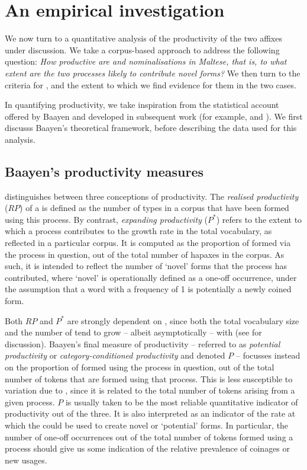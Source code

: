 \documentclass[output=paper]{LSP/langsci}
\begin{document}
\section{An empirical investigation}\label{sec:corpus}
\largerpage
We now turn to a quantitative analysis of the productivity of the two  affixes under discussion. We take a corpus-based approach to address the following question: \textit{How productive are {\ar} and {\zjoni} nominalisations in Maltese, that is, to what extent are the two processes likely to contribute novel forms?} We then turn to the criteria for , and the extent to which we find evidence for them in the two cases.

In quantifying productivity, we take inspiration from the statistical account offered by Baayen \citep{Baayen1994, Baayen2009} 
and developed in subsequent work (for example, \citealt{Evert} and \citealt{Pustylnikov2009}). We first discusss Baayen's theoretical framework, before describing the data used for this analysis.

\subsection{Baayen's productivity measures}
\citet{Baayen2009} distinguishes between three conceptions of productivity. The \textit{realised productivity} ($RP$) of a  is defined as the number of types in a corpus that have been formed using this process. By contrast, \textit{expanding productivity} ($P^{*}$) refers to the extent to which a process contributes to the growth rate in the total vocabulary, as reflected in a particular corpus. It is computed as the proportion of  formed via the process in question, out of the total number of hapaxes in the corpus. As such, it is intended to reflect the number of `novel' forms that the process has contributed, where `novel' is operationally defined as a one-off occurrence, under the assumption that a word with a frequency of 1 is potentially a newly coined form. 

Both $RP$ and $P^{*}$ are strongly dependent on , since both the total vocabulary size and the number of  tend to grow -- albeit asymptotically -- with  (see \citealt{Baroni2009} for discussion). Baayen's final measure of productivity -- referred to as \textit{potential productivity} or \textit{category-conditioned productivity} and denoted $P$ -- focusses instead on the proportion of  formed using the process in question, out of the total number of tokens that are formed using that process. This is less susceptible to variation due to , since it is related to the total number of tokens arising from a given process. $P$ is usually taken to be the most reliable quantitative indicator of productivity out of the three. It is also interpreted as an indicator of the rate at which the  could be used to create novel or `potential' forms. In particular, the number of one-off occurrences out of the total number of tokens formed using a process should give us some indication of the relative prevalence of coinages or new usages.
\end{document}
